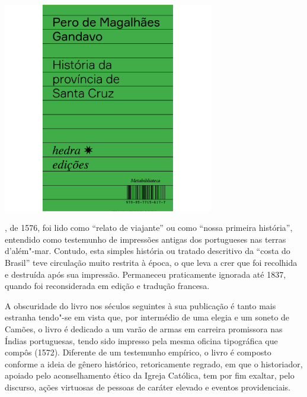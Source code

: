\pagebreak

\begin{center}
\hspace*{-2.5cm}
\hspace*{2.5cm}\includegraphics[width=92mm]{./grid/gandavo.jpg}
\end{center}

\hspace*{-7cm}\hrulefill\hspace*{-7cm}

\medskip

, de 1576, foi lido como “relato de viajante” ou como “nossa primeira história”, entendido como testemunho de impressões antigas dos portugueses nas terras d’além"-mar. Contudo, esta simples história ou tratado descritivo da “costa do Brasil” teve circulação muito restrita à época, o que leva a crer que foi recolhida e destruída após sua impressão. Permaneceu praticamente ignorada até 1837, quando foi reconsiderada em edição e tradução francesa.

A obscuridade do livro nos séculos seguintes à sua publicação é tanto mais estranha tendo"-se em vista que, por intermédio de uma elegia e um soneto de Camões, o livro é dedicado a um varão de armas em carreira promissora nas Índias portuguesas, tendo sido impresso pela mesma oficina tipográfica que compôs {} (1572). Diferente de um testemunho empírico, o livro é composto conforme a ideia de gênero histórico, retoricamente regrado, em que o historiador, apoiado pelo aconselhamento ético da Igreja Católica, tem por fim exaltar, pelo discurso, ações virtuosas de pessoas de caráter elevado e eventos providenciais.

